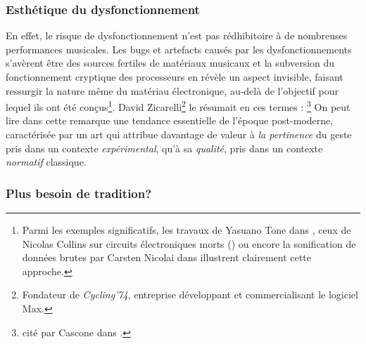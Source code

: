 	
\subsubsection{Esthétique du dysfonctionnement}

\noindent En effet, le risque de dysfonctionnement n'est pas rédhibitoire à de nombreuses performances musicales. Les bugs et artefacts causés par les dysfonctionnements s'avèrent être des sources fertiles de matériaux musicaux et la subversion du fonctionnement cryptique des processeurs en révèle un aspect invisible, faisant ressurgir la nature même du matériau électronique, au-delà de l'objectif pour lequel ils ont été conçus\footnote{Parmi les exemples significatifs, les travaux de Yasuano Tone dans , ceux de Nicolas Collins sur circuits électroniques morts () ou encore la sonification de données brutes par Carsten Nicolai dans  illustrent clairement cette approche.}. David Zicarelli\footnote{Fondateur de \textit{Cycling'74}, entreprise développant et commercialisant le logiciel Max.} le résumait en ces termes : \footnote{ cité par Cascone dans \cite{cascone_aesthetics_2000}.} On peut lire dans cette remarque une tendance essentielle de l'époque post-moderne, caractérisée par un art qui attribue davantage de valeur à \textit{la pertinence} du geste pris dans un contexte \textit{expérimental}, qu'à sa \textit{qualité}, pris dans un contexte \textit{normatif} classique.

\subsubsection{Plus besoin de tradition?}

